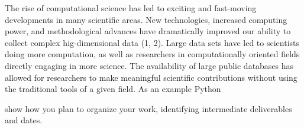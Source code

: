 The rise of computational science has led to exciting and fast-moving developments in many scientific areas. New technologies, increased computing power, and methodological advances have dramatically improved our ability to collect complex hig-dimensional data (1, 2). Large data sets have led to scientists doing more computation, as well as researchers in computationally oriented fields directly engaging in more science. The availability of large public databases has allowed for researchers to make meaningful scientific contributions without using the traditional tools of a given field. As an example Python \cite{peng2011reproducible}

show how you plan to organize your work, identifying intermediate deliverables and dates.